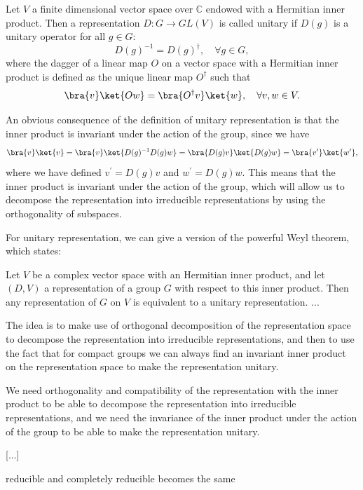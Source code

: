 \begin{definition}
    Let \(V\) a finite dimensional vector space over \(\mathbb{C}\) endowed with a Hermitian inner product. Then a representation \(D : G \to GL(V)\) is called unitary if \(D(g)\) is a unitary operator for all \(g \in G\):
    \[
        D(g)^{-1} = D(g)^{\dagger}, \quad \forall g \in G,
    \]
    where the dagger of a linear map \(O\) on a vector space with a Hermitian inner product is defined as the unique linear map \(O^{\dagger}\) such that
    \[
        \bra{v} \ket{O w} =  \bra{O^{\dagger} v}\ket{w}, \quad \forall v,w \in V.
    \]
\end{definition}

An obvious consequence of the definition of unitary representation is that the inner product is invariant under the action of the group, since we have
\[
    \bra{v}\ket{v} = \bra{v}\ket{D(g)^{-1}D(g)w} = \bra{D(g)v}\ket{D(g)w} = \bra{v^{\prime}}\ket{w^{\prime}},
\]
where we have defined \(v^{\prime} = D(g)v\) and \(w^{\prime} = D(g)w\). This means that the inner product is invariant under the action of the group, which will allow us to decompose the representation into irreducible representations by using the orthogonality of subspaces.

For unitary representation, we can give a version of the powerful Weyl theorem, which states:
\begin{theorem}
    Let \(V\) be a complex vector space with an Hermitian inner product, and let \((D,V)\) a representation of a group \(G\) with respect to this inner product. Then any representation of \(G\) on \(V\) is equivalent to a unitary representation. ...
\end{theorem}

The idea is to make use of orthogonal decomposition of the representation space to decompose the representation into irreducible representations, and then to use the fact that for compact groups we can always find an invariant inner product on the representation space to make the representation unitary.

We need orthogonality and compatibility of the representation with the inner product to be able to decompose the representation into irreducible representations, and we need the invariance of the inner product under the action of the group to be able to make the representation unitary.

    [...]

reducible and completely reducible becomes the same

